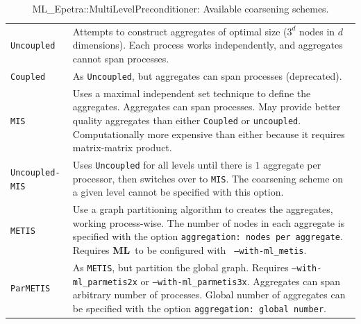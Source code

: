 \documentclass{article}[11pt]
\newcommand{\ML}     {{\bf ML}}
\begin{document}
\begin{table}[tbh]
\begin{center}
\begin{tabular}{ | p{4cm} | p{10cm} | }
\hline
\verb!Uncoupled! & Attempts to construct
aggregates of optimal size ($3^d$ nodes in $d$ dimensions).
Each process works independently, and aggregates cannot span processes.\\
\verb!Coupled! & As \verb!Uncoupled!, but aggregates can span processes (deprecated).\\
\verb!MIS! & Uses a maximal independent set technique to define the
aggregates. Aggregates can span
processes. May provide better quality aggregates than either \verb!Coupled! or
\verb!uncoupled!.
Computationally more expensive than either because it requires
matrix-matrix product. \\
\verb!Uncoupled-MIS! & Uses \verb!Uncoupled! for all levels until there is $1$
aggregate per processor,  then switches over to \verb!MIS!.
The coarsening scheme on a given level cannot be specified with this option.\\
\verb!METIS! & Use a graph partitioning algorithm to creates the
aggregates, working process-wise. The number of nodes in each aggregate
is specified with the option {\tt aggregation: nodes per
  aggregate}. Requires \ML\ to be configured with {\tt
  --with-ml\_metis}. \\
\verb!ParMETIS! & As \verb!METIS!, but partition the global
graph. Requires {\tt --with-ml\_parmetis2x} or {\tt --with-ml\_parmetis3x}. Aggregates can span
arbitrary number of processes. Global number of aggregates can be
specified with the option {\tt aggregation: global number}. \\
\hline
\end{tabular}
\caption{ML\_Epetra::MultiLevelPreconditioner: Available coarsening schemes.}
\label{tab:ml:aggr}
\end{center}
\end{table}
%
\end{document}
